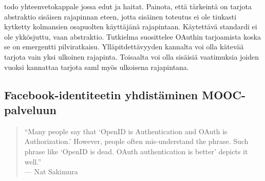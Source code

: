 \documentclass[finnish,gradu]{tktltiki}
\begin{document}
  todo yhteenvetokappale jossa edut ja haitat. Painota, että tärkeintä on tarjota abstraktio sisäisen rajapinnan eteen, jotta sisäinen toteutus ei ole tiukasti kytketty kolmansien osapuolten käyttäjänä rajapintaan. Käytettävä standardi ei ole ykkösjuttu, vaan abstraktio. Tutkielma suosittelee OAuthin tarjoamista koska se on emergentti pilviratkaisu. Ylläpitdettävyyden kannalta voi olla kätevää tarjota vain yksi ulkoinen rajapinta. Toisaalta voi olla sisäisiä vaatimuksia joiden vuoksi kannattaa tarjota saml myös ulkoisena rajapintana.







  \subsection{Facebook-identiteetin yhdistäminen MOOC-palveluun} %
  \label{ssub:mooc_fb_auth}

  \begin{quote}
    ``Many people say that `OpenID is Authentication and OAuth is Authorization.' However, people often mis-understand the phrase. Such phrase like `OpenID is dead. OAuth authentication is better' depicts it well.''
    \\--- Nat Sakimura~\cite{sakimura_dummydiff_oauth_openid_2011}
  \end{quote}
\end{document}
